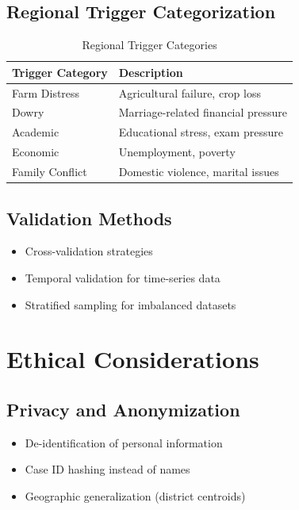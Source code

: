 \documentclass[12pt,a4paper]{article}
\begin{document}
\subsection{Regional Trigger Categorization}
\begin{table}[H]
\centering
\caption{Regional Trigger Categories}
\label{tab:triggers}
\begin{tabular}{@{}ll@{}}
\toprule
\textbf{Trigger Category} & \textbf{Description} \\
\midrule
Farm Distress & Agricultural failure, crop loss \\
Dowry & Marriage-related financial pressure \\
Academic & Educational stress, exam pressure \\
Economic & Unemployment, poverty \\
Family Conflict & Domestic violence, marital issues \\
\bottomrule
\end{tabular}
\end{table}

\subsection{Validation Methods}
\begin{itemize}
    \item Cross-validation strategies
    \item Temporal validation for time-series data
    \item Stratified sampling for imbalanced datasets
\end{itemize}

\section{Ethical Considerations}

\subsection{Privacy and Anonymization}
\begin{itemize}
    \item De-identification of personal information
    \item Case ID hashing instead of names
    \item Geographic generalization (district centroids)
\end{itemize}
\end{document}
